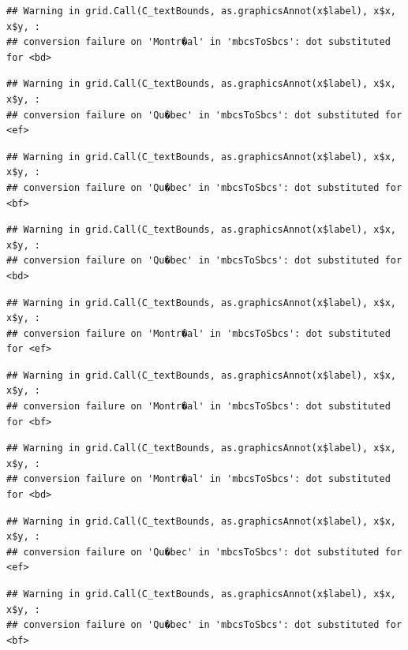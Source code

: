 \documentclass[]{article}
\begin{document}
\begin{verbatim}
## Warning in grid.Call(C_textBounds, as.graphicsAnnot(x$label), x$x, x$y, :
## conversion failure on 'Montr�al' in 'mbcsToSbcs': dot substituted for <bd>
\end{verbatim}

\begin{verbatim}
## Warning in grid.Call(C_textBounds, as.graphicsAnnot(x$label), x$x, x$y, :
## conversion failure on 'Qu�bec' in 'mbcsToSbcs': dot substituted for <ef>
\end{verbatim}

\begin{verbatim}
## Warning in grid.Call(C_textBounds, as.graphicsAnnot(x$label), x$x, x$y, :
## conversion failure on 'Qu�bec' in 'mbcsToSbcs': dot substituted for <bf>
\end{verbatim}

\begin{verbatim}
## Warning in grid.Call(C_textBounds, as.graphicsAnnot(x$label), x$x, x$y, :
## conversion failure on 'Qu�bec' in 'mbcsToSbcs': dot substituted for <bd>
\end{verbatim}

\begin{verbatim}
## Warning in grid.Call(C_textBounds, as.graphicsAnnot(x$label), x$x, x$y, :
## conversion failure on 'Montr�al' in 'mbcsToSbcs': dot substituted for <ef>
\end{verbatim}

\begin{verbatim}
## Warning in grid.Call(C_textBounds, as.graphicsAnnot(x$label), x$x, x$y, :
## conversion failure on 'Montr�al' in 'mbcsToSbcs': dot substituted for <bf>
\end{verbatim}

\begin{verbatim}
## Warning in grid.Call(C_textBounds, as.graphicsAnnot(x$label), x$x, x$y, :
## conversion failure on 'Montr�al' in 'mbcsToSbcs': dot substituted for <bd>
\end{verbatim}

\begin{verbatim}
## Warning in grid.Call(C_textBounds, as.graphicsAnnot(x$label), x$x, x$y, :
## conversion failure on 'Qu�bec' in 'mbcsToSbcs': dot substituted for <ef>
\end{verbatim}

\begin{verbatim}
## Warning in grid.Call(C_textBounds, as.graphicsAnnot(x$label), x$x, x$y, :
## conversion failure on 'Qu�bec' in 'mbcsToSbcs': dot substituted for <bf>
\end{verbatim}
\end{document}
